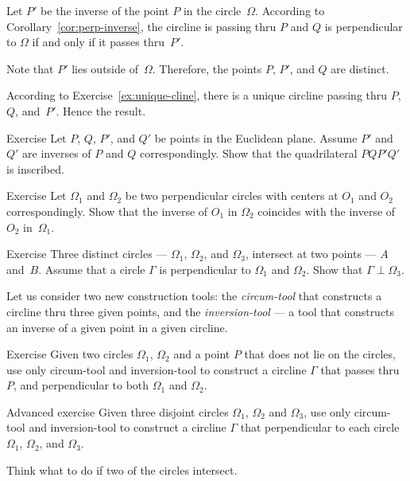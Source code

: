Let $P'$ be the inverse of the point $P$ in the circle~$\Omega$.
According to Corollary~\ref{cor:perp-inverse},
the circline is passing thru $P$ and $Q$ 
is perpendicular to $\Omega$ if and only if it passes thru~$P'$.

Note that $P'$ lies outside of~$\Omega$.
Therefore, the points $P$, $P'$, and $Q$ are distinct.

According to Exercise~\ref{ex:unique-cline},
there is a unique circline passing thru $P$, $Q$, and~$P'$.
Hence the result.
\qeds

\begin{thm}{Exercise}\label{ex:inscribed+inv}
Let $P$, $Q$, $P'$, and $Q'$ be points in the Euclidean plane.
Assume $P'$ and $Q'$ are inverses of $P$ and $Q$ correspondingly.
Show that the quadrilateral $PQP'Q'$ is inscribed.
\end{thm}

\begin{thm}{Exercise}\label{ex:centers-of-perp-circles}
Let $\Omega_1$ and $\Omega_2$ be two perpendicular circles with centers at $O_1$ and $O_2$ correspondingly.
Show that the inverse of $O_1$ in $\Omega_2$ 
coincides with 
the inverse of $O_2$ in~$\Omega_1$.
\end{thm}

\begin{thm}{Exercise}\label{ex:4-th-perp-circ}
Three distinct circles --- $\Omega_1$, $\Omega_2$, and $\Omega_3$, intersect at two points --- $A$ and~$B$.
Assume that a circle $\Gamma$ is perpendicular to $\Omega_1$ and $\Omega_2$.
Show that $\Gamma\perp\Omega_3$.
\end{thm}

Let us consider two new construction tools:
the \emph{circum-tool} that constructs a circline thru three given points, 
and the \emph{inversion-tool} --- a tool that constructs an inverse of a given point in a given circline.

\begin{thm}{Exercise}\label{ex:construction-perp-clines}
Given  two circles $\Omega_1$, $\Omega_2$ and a point $P$ that does not lie on the circles,
use only circum-tool and inversion-tool to construct a circline $\Gamma$ that passes thru $P$, 
and perpendicular to both $\Omega_1$ and $\Omega_2$.
\end{thm}

\begin{thm}{Advanced exercise}\label{ex:3-construction-perp-clines}
Given  three disjoint circles $\Omega_1$, $\Omega_2$ and $\Omega_3$,
use only circum-tool and inversion-tool to construct a circline $\Gamma$ that perpendicular to each circle $\Omega_1$, $\Omega_2$, and $\Omega_3$.

Think what to do if two of the circles intersect.
\end{thm}

